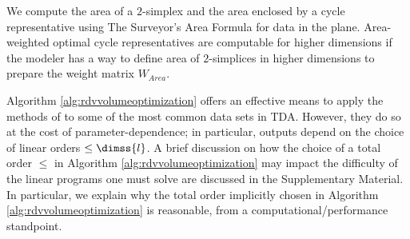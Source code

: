 

 We compute the area of a $2$-simplex and the area enclosed by a cycle representative using The Surveyor's Area Formula \cite{TheSurveyorsAreaFormula} for data in the plane. %
 Area-weighted optimal cycle representatives are computable for higher dimensions if the modeler has a way to define area of $2$-simplices in higher dimensions to prepare the weight matrix $W_{Area}$. 


\begin{remark} Algorithm \ref{alg:rdvvolumeoptimization} offers an effective means to apply the methods of \cite{Obayashi2018} to some of the most common data sets in TDA.  However, they do so at the cost of parameter-dependence; in particular, outputs depend on the choice of linear orders $\le\dimss{l}$.  
A brief discussion on how the choice of a total order $\le$ in Algorithm \ref{alg:rdvvolumeoptimization} may impact the difficulty of the linear programs one must solve are discussed in the Supplementary Material.  In particular, we explain why the total order implicitly chosen in Algorithm \ref{alg:rdvvolumeoptimization} is reasonable,  from a computational/performance standpoint.
\end{remark}





